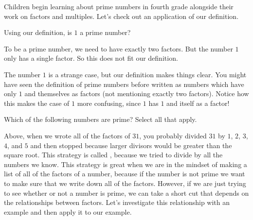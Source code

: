 \documentclass{ximera}
\begin{document}
Children begin learning about prime numbers in fourth grade alongside their work on factors and multiples. Let's check out an application of our definition.

\begin{question}
Using our definition, is $1$ a prime number?

\begin{multipleChoice}
\begin{feedback}[correct]
 To be a prime number, we need to have exactly two factors. But the number $1$ only has a single factor. So this does not fit our definition.
\end{feedback}
\end{multipleChoice}
\end{question}

The number $1$ is a strange case, but our definition makes things clear. You might have seen the definition of prime numbers before written as numbers which have only $1$ and themselves as factors (not mentioning exactly two factors). Notice how this makes the case of $1$ more confusing, since $1$ has $1$ and itself as a factor!

\begin{question}
Which of the following numbers are prime? Select all that apply.
\begin{selectAll}
\end{selectAll}
\end{question}


Above, when we wrote all of the factors of $31$, you probably divided $31$ by $1$, $2$, $3$, $4$, and $5$ and then stopped because larger divisors would be greater than the square root. This strategy is called , because we tried to divide by all the numbers we know. This strategy is great when we are in the mindset of making a list of all of the factors of a number, because if the number is not prime we want to make sure that we write down all of the factors. However, if we are just trying to see whether or not a number is prime, we can take a short cut that depends on the relationships between factors. Let's investigate this relationship with an example and then apply it to our example.
\end{document}
